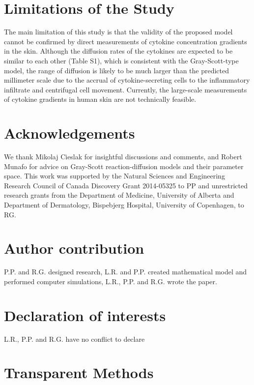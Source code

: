 \section{Limitations of the Study}
The main limitation of this study is that the validity of the proposed model cannot be confirmed by direct measurements of cytokine concentration gradients in the skin. Although the diffusion rates of the cytokines are expected to be similar to each other (Table S1), which is consistent with the Gray-Scott-type model, the range of diffusion is likely to be much larger than the predicted millimeter scale due to the accrual of cytokine-secreting cells to the inflammatory infiltrate and centrifugal cell movement. Currently, the large-scale measurements of cytokine gradients in human skin are not technically feasible. 

\section{Acknowledgements}
We thank Mikolaj Cieslak for insightful discussions and comments, and Robert Munafo for advice on Gray-Scott reaction-diffusion models and their parameter space. This work was supported by the Natural Sciences and Engineering Research Council of Canada Discovery Grant 2014-05325 to PP and unrestricted research grants from the Department of Medicine, University of Alberta and Department of Dermatology, Bispebjerg Hospital, University of Copenhagen, to RG.

\section{Author contribution}
P.P. and R.G. designed research, L.R. and P.P. created mathematical model and performed computer simulations, L.R., P.P. and R.G. wrote the paper. 

\section{Declaration of interests}
L.R., P.P. and R.G. have no conflict to declare

\section{Transparent Methods}
